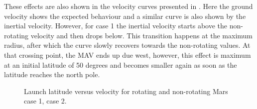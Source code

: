 \noindent
These effects are also shown in the velocity curves presented in . Here the ground velocity shows the expected behaviour and a similar curve is also shown by the inertial velocity. However, for case 1 the inertial velocity starts above the non-rotating velocity and then drops below. This transition happens at the maximum radius, after which the curve slowly recovers towards the non-rotating values. At that crossing point, the \ac{MAV} ends up due west, however, this effect is maximum at an initial latitude of 50 degrees and becomes smaller again as soon as the latitude reaches the north pole.

\begin{figure}[H]
\centering
{} 
\caption{Launch latitude versus velocity for rotating and non-rotating Mars \protect{} case 1,  \protect{} case 2. } 
\label{fig:launchLatitudeVsVelocityCase1combined} 
\end{figure}



